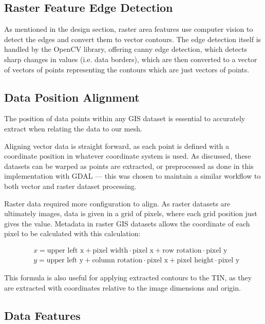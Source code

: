 \documentclass[12pt]{article}
\begin{document}
\subsection{Raster Feature Edge Detection}

As mentioned in the design section, raster area features use computer vision to detect the edges and convert them to vector contours. The edge detection itself is handled by the OpenCV library, offering canny edge detection, which detects sharp changes in values (i.e. data borders), which are then converted to a vector of vectors of points representing the contours which are just vectors of points.

\subsection{Data Position Alignment}

The position of data points within any GIS dataset is essential to accurately extract when relating the data to our mesh.

Aligning vector data is straight forward, as each point is defined with a coordinate position in whatever coordinate system is used. As discussed, these datasets can be warped as points are extracted, or preprocessed as done in this implementation with GDAL --- this was chosen to maintain a similar workflow to both vector and raster dataset processing.

Raster data required more configuration to align. As raster datasets are ultimately images, data is given in a grid of pixels, where each grid position just gives the value. Metadata in raster GIS datasets allows the coordinate of each pixel to be calculated with this calculation:

\begin{align}
   & x = \text{upper left x} + \text{pixel width} \cdot \text{pixel x} + \text{row rotation} \cdot \text{pixel y}     \\
   & y = \text{upper left y} + \text{column rotation} \cdot \text{pixel x} + \text{pixel height} \cdot \text{pixel y}
\end{align}

This formula is also useful for applying extracted contours to the TIN, as they are extracted with coordinates relative to the image dimensions and origin.

\subsection{Data Features}
\end{document}
